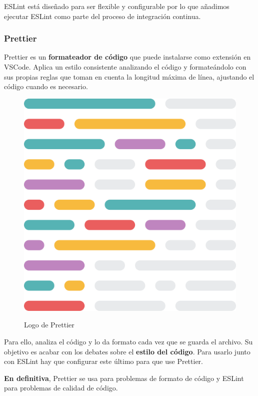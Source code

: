 \documentclass[12pt,twoside,titlepage]{report}
\begin{document}
ESLint está diseñado para ser flexible y configurable por lo que añadimos ejecutar ESLint como parte del proceso de integración continua.

\subsubsection{Prettier}

Prettier es un \textbf{formateador de código} que puede instalarse como extensión en VSCode. Aplica un estilo consistente analizando el código y formateándolo con sus propias reglas que toman en cuenta la longitud máxima de línea, ajustando el código cuando es necesario.

\begin{figure}[H]
    \centering
    \includegraphics[scale=0.02]{VSCode/Prettier}
    \label{fig:PrettierLogo}
    \caption{Logo de Prettier}
\end{figure}

Para ello, analiza el código y lo da formato cada vez que se guarda el archivo. Su objetivo es acabar con los debates sobre el \textbf{estilo del código}. Para usarlo junto con ESLint hay que configurar este último para que use Prettier.

\textbf{En definitiva}, Prettier se usa para problemas de formato de código y ESLint para problemas de calidad de código.
\end{document}
